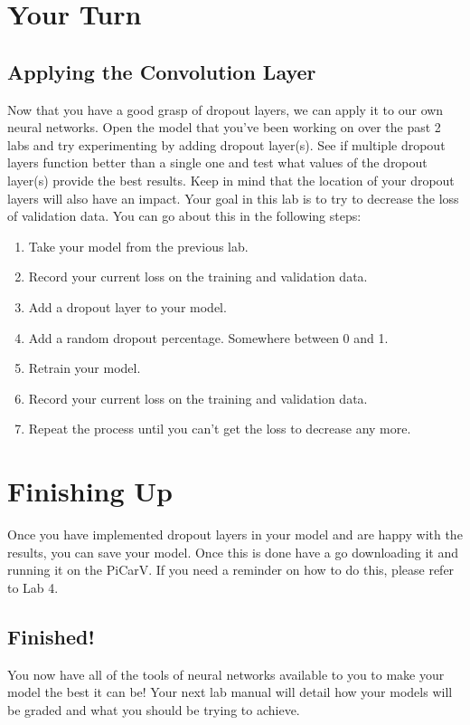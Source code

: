 \documentclass[11pt]{report}
\begin{document}


\chapter{Your Turn}
\section{Applying the Convolution Layer}
Now that you have a good grasp of dropout layers, we can apply it to our own neural networks. Open the model that you've been working on over the past 2 labs and try experimenting by adding dropout layer(s). See if multiple dropout layers function better than a single one and test what values of the dropout layer(s) provide the best results. Keep in mind that the location of your dropout layers will also have an impact.
Your goal in this lab is to try to decrease the loss of validation data. You can go about this in the following steps:

\begin{enumerate}
    \item{Take your model from the previous lab.}
    \item{Record your current loss on the training and validation data.}
    \item{Add a dropout layer to your model.}
    \item{Add a random dropout percentage. Somewhere between 0 and 1.}
    \item{Retrain your model.}
    \item{Record your current loss on the training and validation data.}
    \item{Repeat the process until you can't get the loss to decrease any more.}
\end{enumerate}


\pagebreak

\chapter{Finishing Up}

Once you have implemented dropout layers in your model and are happy with the results, you can save your model. Once this is done have a go downloading it and running it on the PiCarV. If you need a reminder on how to do this, please refer to Lab 4.

\section{Finished!}
You now have all of the tools of neural networks available to you to make your model the best it can be! Your next lab manual will detail how your models will be graded and what you should be trying to achieve.
\end{document}
